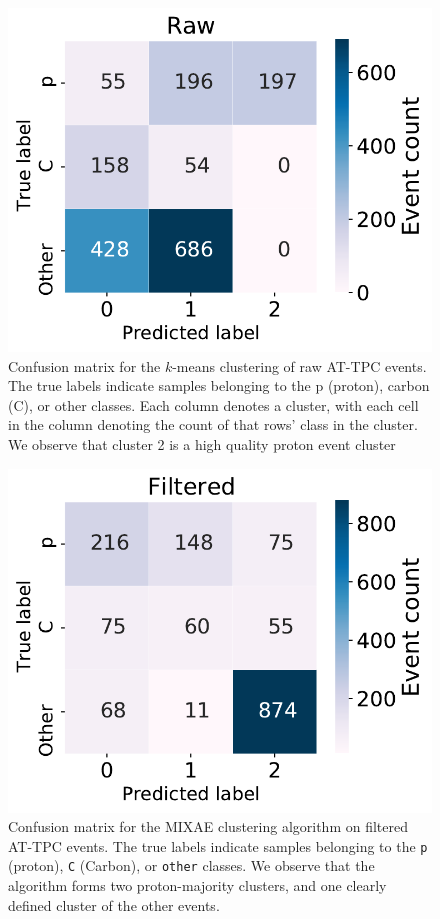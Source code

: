 \documentclass[preprint,12pt]{elsarticle}
\begin{document}
\begin{figure}
	\includegraphics[width=\textwidth]{custom_work/Rawcache_conf_mat.pdf}
\caption[Pre-trained network - confusion matrices]{Confusion matrix for the $k$-means clustering of raw AT-TPC events. The true labels indicate samples belonging to the p (proton), carbon (C), or other classes. Each column denotes a cluster, with each cell in the column denoting the count of that rows' class in the cluster. We observe that cluster 2 is a high quality proton event cluster }\label{fig:clster_confmati_raw}
\end{figure}


\begin{figure}
\centering
	\includegraphics[width=\textwidth]{custom_work/Filtered_mixae_conf_mat.pdf}
\caption[MIXAE - confusion matrices]{Confusion matrix for the MIXAE clustering algorithm on filtered AT-TPC events. The true labels indicate samples belonging to the \texttt{p} (proton), \texttt{C} (Carbon), or \texttt{other} classes. We observe that the algorithm forms two proton-majority clusters, and one clearly defined cluster of the other events. }\label{fig:mixae_confmat_filtered}
\end{figure}
\end{document}
